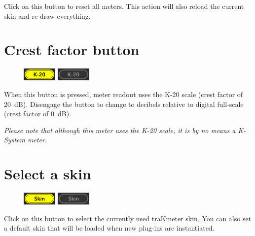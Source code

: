 Click on this button to reset all meters.  This action will also
reload the current skin and re-draw everything.

\section{Crest factor button}
\label{sec:crest_factor_button}

\begin{figure}
\includegraphics[scale=\screenshotscale,clip]{include/images/button_crest_factor_on.png}
\newline \vspace{-0.9\baselineskip}
\includegraphics[scale=\screenshotscale,clip]{include/images/button_crest_factor_off.png}
\end{figure}

When this button is pressed, meter readout uses the K-20 scale (crest
factor of \SI{20}{\dB}).  Disengage the button to change to decibels
relative to digital full-scale (crest factor of \SI{0}{\dB}).

\emph{Please note that although this meter uses the K-20 scale, it is
  by no means a K-System meter.}

\newpage %

\section{Select a skin}

\begin{figure}
\includegraphics[scale=\screenshotscale,clip]{include/images/button_skin_on.png}
\newline \vspace{-0.9\baselineskip}
\includegraphics[scale=\screenshotscale,clip]{include/images/button_skin_off.png}
\end{figure}

Click on this button to select the currently used traKmeter skin.  You
can also set a default skin that will be loaded when new plug-ins are
instantiated.

